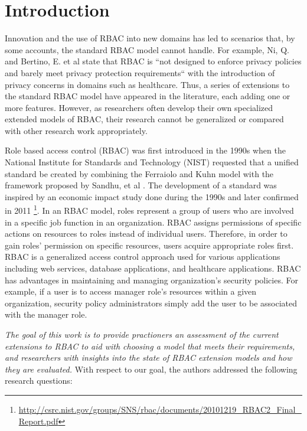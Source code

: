 \section{Introduction} \label{sec:introduction}

Innovation and the use of RBAC into new domains has led to scenarios that, by some accounts, the standard RBAC model cannot handle.  For example, Ni, Q. and Bertino, E. et al \cite{ni2010privacy} state that RBAC is ``not designed to enforce privacy policies and barely meet privacy protection requirements`` with the introduction of privacy concerns in domains such as healthcare. Thus, a series of extensions to the standard RBAC model have appeared in the literature, each adding one or more features.  However, as researchers often develop their own specialized extended models of RBAC, their research cannot be generalized or compared with other research work appropriately.

Role based access control (RBAC) was first introduced in the 1990s when the National Institute for Standards and Technology (NIST) requested that a unified standard be created by combining the Ferraiolo and Kuhn model \cite{ferraiolokuhn} with the framework proposed by Sandhu, et al \cite{sandhu1996role}.  The development of a standard was inspired by an economic impact study done during the 1990s and later confirmed in 2011 \footnote{\url{http://csrc.nist.gov/groups/SNS/rbac/documents/20101219_RBAC2_Final_Report.pdf}}. In an RBAC model, roles represent a group of users who are involved in a specific job function in an organization. RBAC assigns permissions of specific actions on resources to roles instead of individual users.  Therefore, in order to gain roles' permission on specific resources, users acquire appropriate roles first.  RBAC is a generalized access control approach used for various applications including web services, database applications, and healthcare applications.  RBAC has advantages in maintaining and managing organization's security policies.  For example, if a user is to access manager role's resources within a given organization, security policy administrators simply add the user to be associated with the manager role.

\textit{The goal of this work is to provide practioners an assessment of the current extensions to RBAC to aid with choosing a model that meets their requirements, and researchers with insights into the state of RBAC extension models and how they are evaluated.} With respect to our goal, the authors addressed the following research questions:

